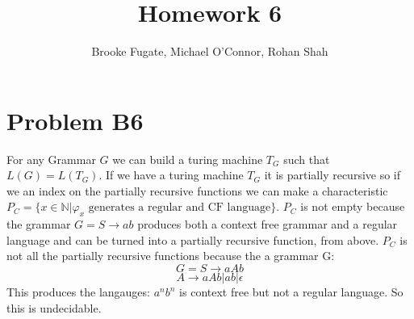 \documentclass[12pt]{article}
\begin{document}
\pagestyle{plain}
\titleformat{\subsection}[runin]
  {\normalfont\large\bfseries}{\thesubsection}{1em}{}
\titleformat{\subsubsection}[runin]
  {\bfseries}{}{1em}{}

\title{Homework 6}
\author{Brooke Fugate, Michael O'Connor, Rohan Shah}
\date{}

\maketitle

\section*{Problem B6}

For any Grammar $G$ we can build a turing machine $T_G$ such that $L(G) = L(T_G)$.  If we have a turing machine $T_G$ it is partially recursive so if we an index on the partially recursive functions we can make a characteristic $P_C = \{x \in \mathbb{N} | \varphi_x \text{ generates a regular and CF language} \}$.  $P_C$ is not empty because the grammar $G = S \rightarrow ab$ produces both a context free grammar and a regular language and can be turned into a partially recursive function, from above.  $P_C$ is not all the partially recursive functions because the a grammar G:$$G = S \rightarrow aAb$$ $$A \rightarrow aAb | ab | \epsilon$$  This produces the langauges: $a^nb^n$ is context free but not a regular language.  So this is undecidable.
\end{document}

